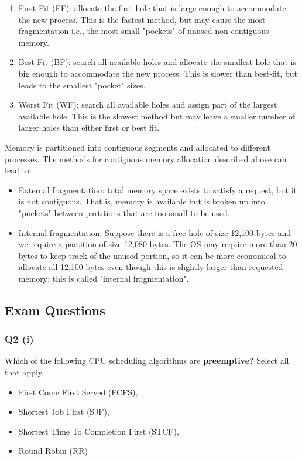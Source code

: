 \documentclass[a4paper, 10pt]{article}
\begin{document}
\begin{enumerate}
    \item First Fit (FF): allocate the first hole that is large enough to accommodate the new process. This is the fastest method, but may cause the most fragmentation-i.e., the most small "pockets" of unused non-contiguous memory.
    \item Best Fit (BF): search all available holes and allocate the smallest hole that is big enough to accommodate the new process. This is slower than best-fit, but leads to the smallest "pocket" sizes.
    \item Worst Fit (WF): search all available holes and assign part of the largest available hole. This is the slowest method but may leave a smaller number of larger holes than either first or best fit.
\end{enumerate}
Memory is partitioned into contiguous segments and allocated to different processes. The methods for contiguous memory allocation described above can lead to:
\begin{itemize}
    \item External fragmentation: total memory space exists to satisfy a request, but it is not contiguous. That is, memory is available but is broken up into "pockets" between partitions that are too small to be used.
    \item Internal fragmentation: Suppose there is a free hole of size 12,100 bytes and we require a partition of size 12,080 bytes. The OS may require more than 20 bytes to keep track of the unused portion, so it can be more economical to allocate all 12,100 bytes even though this is slightly larger than requested memory; this is called "internal fragmentation".
\end{itemize}

\subsection{Exam Questions}
\subsubsection*{Q2 (i)}
Which of the following CPU scheduling algorithms are \textbf{preemptive?} Select all that apply.
\begin{itemize}
    \item First Come First Served (FCFS),
    \item Shortest Job First (SJF),
    \item Shortest Time To Completion First (STCF),
    \item Round Robin (RR)
\end{itemize}
\end{document}
